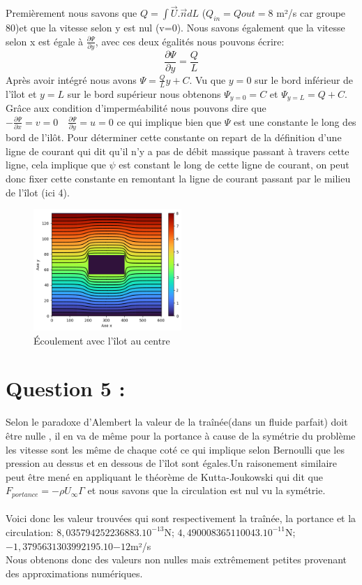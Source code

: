 \documentclass{article}
\begin{document}
Premièrement nous savons que $Q=\int \vec{U}.\Vec{n}dL $ ($Q_{in}=Q{out}=8$ m²/s
car groupe 80)et que la vitesse selon y est nul (v=0). Nous savons également que la vitesse selon x est égale à $\frac{\partial \Psi}{\partial y}$, avec ces deux égalités nous pouvons écrire: $$\frac{\partial \Psi}{\partial y}=\frac{Q}{L}$$
Après avoir intégré nous avons $\Psi=\frac{Q}{L}y+C$. Vu que $y=0$ sur le bord inférieur de l'îlot et $y=L$ sur le bord supérieur nous obtenons $\Psi_{y=0}=C$ et $\Psi_{y=L}=Q+C$.
Grâce aux condition d'imperméabilité nous pouvons dire que $-\frac{\partial \Psi}{\partial x}=v=0\quad\frac{\partial \Psi}{\partial y}=u=0 $ ce qui implique bien que $\Psi$ est une constante le long des bord de l'ilôt. Pour déterminer cette constante on repart de la définition d'une ligne de courant qui dit qu'il n'y a pas de débit massique passant à travers cette ligne, cela implique que $\psi$ est constant le long de cette ligne de courant, on peut donc fixer cette constante en remontant la ligne de courant passant par le milieu de l'îlot   (ici 4).
\begin{figure}[h]
        \centering
        \includegraphics[width=0.5\textwidth]{"../pictures/stream2.png"}
        \caption{  Écoulement avec l'îlot au centre  }
        \label{fig1}
    \end{figure}
\pagebreak
\section*{Question 5 :}
Selon le paradoxe d'Alembert la valeur de la traînée(dans un fluide parfait) doit être nulle , il en va de même pour la portance à cause de la symétrie du problème les vitesse sont les même de chaque coté ce qui implique selon Bernoulli que les pression au dessus et en dessous de l'îlot sont égales.Un raisonement similaire peut être mené en appliquant le théorème de Kutta-Joukowski qui dit que $F_{portance}=-\rho U_{\infty} \Gamma$ et nous savons que la circulation est nul vu la symétrie.
\\ \\ Voici donc les valeur trouvées qui sont respectivement la traînée, la portance et la circulation: $8,035794252236883.10^{-13}$N; $ 4,490008365110043.10^{-11}$N; $-1,3795631303992195.10{-12}$m²/s 
\\ Nous obtenons donc des valeurs non nulles mais extrêmement petites provenant  des approximations numériques.
\end{document}
